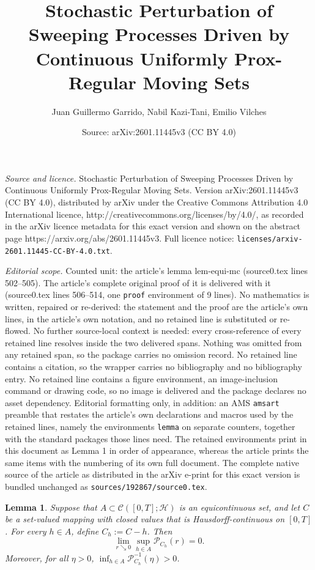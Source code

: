 \documentclass[10pt,a4paper]{amsart}
\title{Stochastic Perturbation of Sweeping Processes Driven by Continuous Uniformly Prox-Regular Moving Sets}
\author{Juan Guillermo Garrido, Nabil Kazi-Tani, Emilio Vilches}
\date{Source: arXiv:2601.11445v3 (CC BY 4.0)}
\newtheorem{lemma}{Lemma}
\renewcommand{\H}{\mathcal{H}}
\begin{document}
\maketitle

\noindent\emph{Source and licence.} Stochastic Perturbation of Sweeping Processes Driven by Continuous Uniformly Prox-Regular Moving Sets. Version arXiv:2601.11445v3 (CC BY 4.0), distributed by arXiv under the Creative Commons Attribution 4.0 International licence, http://creativecommons.org/licenses/by/4.0/, as recorded in the arXiv licence metadata for this exact version and shown on the abstract page https://arxiv.org/abs/2601.11445v3. Full licence notice: \texttt{licenses/arxiv-2601.11445-CC-BY-4.0.txt}.\par\smallskip

\noindent\textit{Editorial scope.} Counted unit: the article's lemma lem-equi-mc (source0.tex lines 502--505). The article's complete original proof of it is delivered with it (source0.tex lines 506--514, one \texttt{proof} environment of 9 lines). No mathematics is written, repaired or re-derived: the statement and the proof are the article's own lines, in the article's own notation, and no retained line is substituted or re-flowed.  No further source-local context is needed: every cross-reference of every retained line resolves inside the two delivered spans.  Nothing was omitted from any retained span, so the package carries no omission record.  No retained line contains a citation, so the wrapper carries no bibliography and no bibliography entry.  No retained line contains a figure environment, an image-inclusion command or drawing code, so no image is delivered and the package declares no asset dependency.  Editorial formatting only, in addition: an AMS \texttt{amsart} preamble that restates the article's own declarations and macros used by the retained lines, namely the environments \texttt{lemma} on separate counters, together with the standard packages those lines need.  The retained environments print in this document as Lemma 1 in order of appearance, whereas the article prints the same items with the numbering of its own full document.  The complete native source of the article as distributed in the arXiv e-print for this exact version is bundled unchanged as \texttt{sources/192867/source0.tex}.
    \begin{lemma}\label{lem-equi-mc}
		Suppose that $A\subset \mathcal{C}([0,T];\H)$ is an equicontinuous set, and let $C$ be a set-valued mapping with closed values that is Hausdorff-continuous on $[0,T]$. For every $h\in A$, define $C_h := C-h$. Then $$\lim_{r\searrow 0}\sup_{h\in A}\mathscr{P}_{C_h}(r) = 0.$$
        Moreover, for all $\eta>0$, $\displaystyle\inf_{h\in A} \mathscr{P}_{C_h}^{-1}(\eta)>0$.
	\end{lemma}
\end{document}
